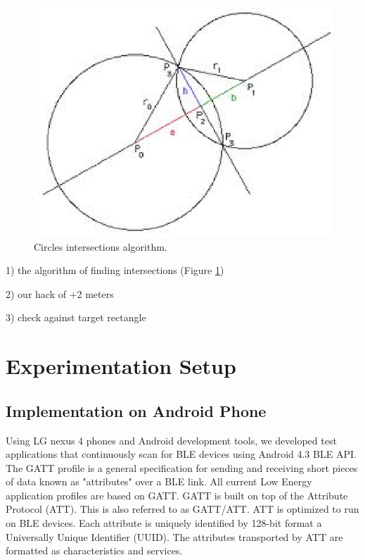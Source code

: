 \documentclass[conference,a4paper]{../../sty/IEEEtran}
\begin{document}
\begin{figure}[h!]
\centering
\includegraphics[scale=0.7]{intr.eps}
\caption{Circles intersections algorithm.\cite{cshint}}
\label{fig2}
\end{figure}

1) the algorithm of finding intersections (Figure \ref{fig2})\cite{cshint}

2) our hack of +2 meters

3) check against target rectangle


\section{Experimentation Setup}

\subsection{Implementation on Android Phone}

Using LG nexus 4 phones and Android development tools, we developed test applications that continuously scan for BLE devices using Android 4.3 BLE API. The GATT profile is a general specification for sending and receiving short pieces of data known as "attributes" over a BLE link. All current Low Energy application profiles are based on GATT. GATT is built on top of the Attribute Protocol (ATT). This is also referred to as GATT/ATT. ATT is optimized to run on BLE devices. Each attribute is uniquely identified by 128-bit format a Universally Unique Identifier (UUID). The attributes transported by ATT are formatted as characteristics and services.
\end{document}
